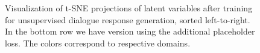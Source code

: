 \begin{figure}[h]
\caption{Visualization of t-SNE projections of latent variables after training for unsupervised dialogue response generation, sorted left-to-right. In the bottom row we have version using the additional placeholder loss. The colors correspond to respective domains.}
\label{05:fig:ft-layers}
\end{figure}

